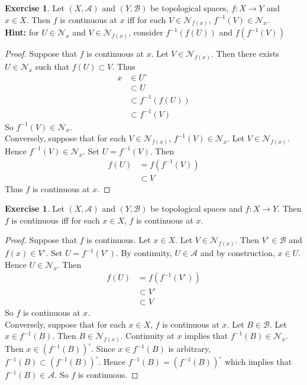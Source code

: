 \documentclass[12pt]{amsart}
\theoremstyle{definition}
\newtheorem{ex}[definition]{Exercise}
\newcommand{\MA}{\mathcal{A}}
\newcommand{\MB}{\mathcal{B}}
\newcommand{\MN}{\mathcal{N}}
\newcommand{\lex}[1]{\label{ex:#1}}
\begin{document}
	\begin{ex} \lex{}
	Let $(X,\MA)$ and $(Y,\MB)$ be topological spaces, $f:X \rightarrow Y$ and $x \in X$. Then $f$ is continuous at $x$ iff for each $V \in \MN_{f(x)}$, $f^{-1}(V) \in \MN_{x}$.\\
	\textbf{Hint:} for $U \in \MN_x$ and $V \in \MN_{f(x)}$, consider $f^{-1}(f(U))$ and $f(f^{-1}(V))$
	\end{ex}
	
	\begin{proof}
	Suppose that $f$ is continuous at $x$. Let $V \in \MN_{f(x)}$. Then there exists $U \in \MN_x$ such that $f(U) \subset V$. Thus
	\begin{align*}
	x 
	&\in U^{\circ} \\
	& \subset U \\
	&\subset f^{-1}(f(U)) \\
	&\subset f^{-1}(V)
	\end{align*}
	So $f^{-1}(V) \in \MN_x$.\\
	Conversely, suppose that for each $V \in \MN_{f(x)}$, $f^{-1}(V) \in \MN_{x}$. Let $V \in \MN_{f(x)}$. Hence $f^{-1}(V) \in \MN_{x}$. Set $U = f^{-1}(V)$. Then 
	\begin{align*}
	f(U) 
	&= f(f^{-1}(V)) \\
	& \subset V
	\end{align*}
	Thus $f$ is continuous at $x$.
	\end{proof}
	
	\begin{ex} \lex{}
	Let $(X,\MA)$ and $(Y,\MB)$ be topological spaces and $f:X \rightarrow Y$. Then $f$ is continuous iff for each $x \in X$, $f$ is continuous at $x$.
	\end{ex}
	
	\begin{proof}
	Suppose that $f$ is continuous. Let $x \in X$. Let $V \in \MN_{f(x)}$. Then $V^{\circ} \in \MB$ and $f(x) \in V^{\circ}$. Set $U = f^{-1}(V^{\circ})$. By continuity, $U \in \MA$ and by construction, $x \in U$. Hence $U \in \MN_x$. Then 
	\begin{align*}
	f(U)
	&= f(f^{-1}(V^{\circ}))\\
	& \subset V^{\circ}\\
	& \subset V
\end{align*}	 	
So $f$ is continuous at $x$. \\
Conversely, suppose that for each $x \in X$, $f$ is continuous at $x$. Let $B \in \MB$. Let $x \in f^{-1}(B)$. Then $B \in \MN_{f(x)}$. Continuity at $x$ implies that $f^{-1}(B) \in \MN_x$. Then $x \in (f^{-1}(B))^{\circ}$. Since $x \in f^{-1}(B)$ is arbitrary, $f^{-1}(B) \subset (f^{-1}(B))^{\circ}$. Hence $f^{-1}(B) = (f^{-1}(B))^{\circ}$ which implies that $f^{-1}(B) \in \MA$. So $f$ is continuous.
	\end{proof}
	
\end{document}
